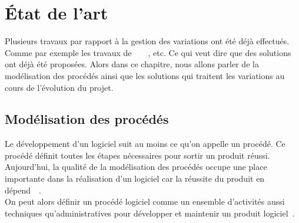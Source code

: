 \chapter{État de l'art} %

\label{Chapitre2} %

Plusieurs travaux par rapport à la gestion des variations ont été déjà effectués. Comme par exemple les travaux de~\cite{sacl}~\cite{alm}~\cite{kabaaj}~\cite{gc}, etc. Ce qui veut dire que des solutions ont déjà été proposées. Alors dans ce chapitre, nous allons parler de la modélisation des procédés ainsi que les solutions qui traitent les variations au cours de l'évolution du projet.\\
\section{Modélisation des procédés}
Le développement d'un logiciel suit au moins ce qu'on appelle un procédé.  Ce procédé définit toutes les étapes nécessaires pour sortir un produit réussi. Aujourd'hui, la qualité de la modélisation des procédés occupe une place importante dans la réalisation d'un logiciel car la réussite du produit en dépend~\cite{wsh73}~\cite{abgm}.\\
On peut alors définir un procédé logiciel comme un ensemble d'activités aussi techniques qu'administratives pour développer et maintenir un produit logiciel~\cite{jl}.\\
